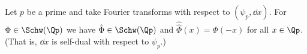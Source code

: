 Let $p$ be a prime and take Fourier transforms with respect to $(\psi_p,\dd x)$. For $\Phi\in\Schw(\Qp)$ we have
$\hat\Phi\in\Schw(\Qp)$ and $\hat{\hat\Phi}(x)=\Phi(-x)$ for all $x\in\Qp$. (That is, $\dd x$ is self-dual with
respect to $\psi_p$.)
